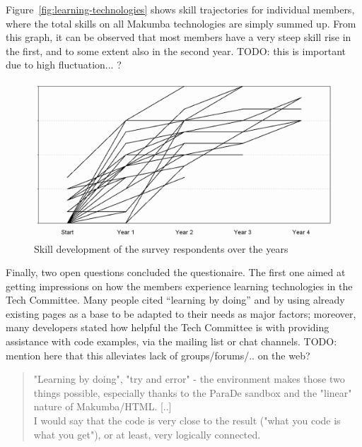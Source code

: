 \documentclass{acm_proc_article-sp}
\begin{document}
Figure~\ref{fig:learning-technologies} shows skill trajectories for individual members, where the total skills on all Makumba technologies are simply summed up. From this graph, it can be observed that most members have a very steep skill rise in the first, and to some extent also in the second year. TODO: this is important due to high fluctuation... ?

\begin{figure}\label{fig:learning-members}
  \includegraphics[width=0.98\columnwidth]{figures/learning-members}
  \caption{Skill development of the survey respondents over the years}
\end{figure} 

Finally, two open questions concluded the questionaire. The first one aimed at getting impressions on how the members experience learning technologies in the Tech Committee. Many people cited ``learning by doing'' and by using already existing pages as a base to be adapted to their needs as major factors; moreover, many developers stated how helpful the Tech Committee is with providing assistance with code examples, via the mailing list or chat channels. TODO: mention here that this alleviates lack of groups/forums/.. on the web?



\begin{quotation}
 	"Learning by doing", "try and error" - the environment makes those two things possible, especially thanks to the ParaDe sandbox and the "linear" nature of Makumba/HTML. [..]\\
 	I would say that the code is very close to the result ("what you code is what you get"), or at least, very logically connected. 
\end{quotation}
\end{document}
